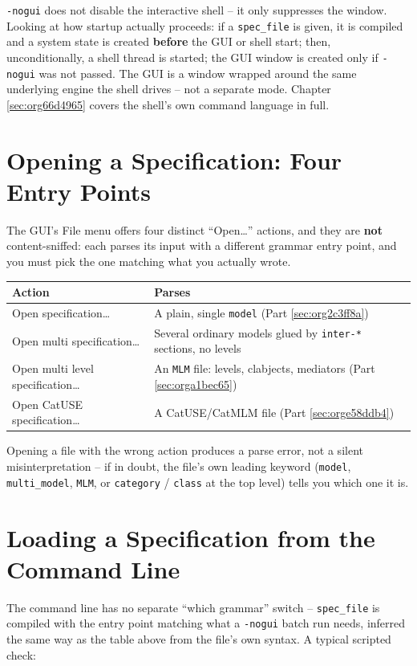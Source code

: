 \documentclass[11pt,twoside,a4paper]{book}
\begin{document}
\texttt{-nogui} does not disable the interactive shell -- it only suppresses
the window. Looking at how startup actually proceeds: if a
\texttt{spec\_file} is given, it is compiled and a system state is created
\textbf{before} the GUI or shell start; then, unconditionally, a shell thread
is started; the GUI window is created only if \texttt{-nogui} was not passed.
The GUI is a window wrapped around the same underlying engine the
shell drives -- not a separate mode. Chapter
\ref{sec:org66d4965} covers the shell's own command
language in full.

\section{Opening a Specification: Four Entry Points}
\label{sec:orgf62dfcf}

The GUI's File menu offers four distinct ``Open\ldots{}'' actions, and they
are \textbf{not} content-sniffed: each parses its input with a different
grammar entry point, and you must pick the one matching what you
actually wrote.

\begin{center}
\begin{tabular}{lp{9cm}}
Action & Parses\\[0pt]
\hline
Open specification\ldots{} & A plain, single \texttt{model} (Part \ref{sec:org2c3ff8a})\\[0pt]
Open multi specification\ldots{} & Several ordinary models glued by \texttt{inter-*} sections, no levels\\[0pt]
Open multi level specification\ldots{} & An \texttt{MLM} file: levels, clabjects, mediators (Part \ref{sec:orga1bec65})\\[0pt]
Open CatUSE specification\ldots{} & A CatUSE/CatMLM file (Part \ref{sec:orge58ddb4})\\[0pt]
\end{tabular}
\end{center}

Opening a file with the wrong action produces a parse error, not a
silent misinterpretation -- if in doubt, the file's own leading
keyword (\texttt{model}, \texttt{multi\_model}, \texttt{MLM}, or \texttt{category} / \texttt{class} at
the top level) tells you which one it is.

\section{Loading a Specification from the Command Line}
\label{sec:org1360463}
The command line has no separate ``which grammar'' switch -- \texttt{spec\_file}
is compiled with the entry point matching what a \texttt{-nogui} batch run
needs, inferred the same way as the table above from the file's own
syntax. A typical scripted check:
\end{document}
